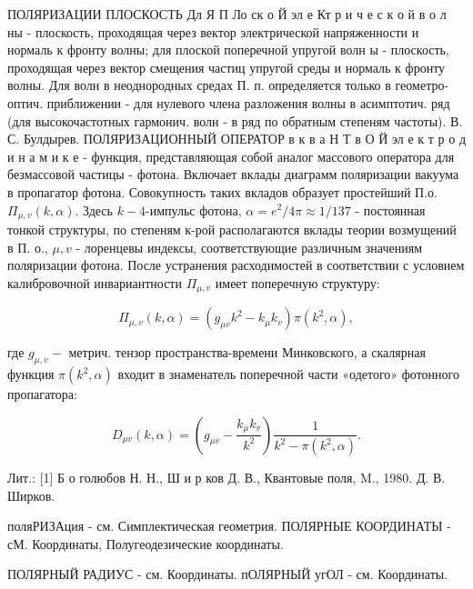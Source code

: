 \documentclass[10pt]{article}
\begin{document}
ПОЛЯРИЗАЦИИ ПЛОСКОСТЬ Дл Я П Ло ск о Й эл е Кт р и ч е с к о й в о л ны - плоскость, проходящая через вектор электрической напряженности и нормаль к фронту волны; для плоской поперечной упругой волн ы - плоскость, проходящая через вектор смещения частиц упругой среды и нормаль к фронту волны. Для волн в неоднородных средах П. п. определяется только в геометро-оптич. приближении - для нулевого члена разложения волны в асимптотич. ряд (для высокочастотных гармонич. волн - в ряд по обратным степеням частоты). В. С. Булдырев. ПОЛЯРИЗАЦИОННЫЙ ОПЕРАТОР в к в а Н Т в О Й эл е к т р о д и н а м и к е - функция, представляющая собой аналог массового оператора для безмассовой частицы - фотона. Включает вклады диаграмм поляризации вакуума в пропагатор фотона. Совокупность таких вкладов образует простейший П.о. $\Pi_{\mu, v}(k, \alpha)$. Здесь $k-4$-импульс фотона, $\alpha=e^{2} / 4 \pi \approx 1 / 137$ - постоянная тонкой структуры, по степеням к-рой располагаются вклады теории возмущений в П. о., $\mu, v$ - лоренцевы индексы, соответствующие различным значениям поляризации фотона. После устранения расходимостей в соответствии с условием калибровочной инвариантности $\Pi_{\mu, v}$ имеет поперечную структуру:



\[

\Pi_{\mu, v}(k, \alpha)=\left(g_{\mu v} k^{2}-k_{\mu} k_{v}\right) \pi\left(k^{2}, \alpha\right),

\]



где $g_{\mu, v}-$ метрич. тензор пространства-времени Минковского, а скалярная функция $\pi\left(k^{2}, \alpha\right)$ входит в знаменатель поперечной части «одетого» фотонного пропагатора:



\[

D_{\mu v}(k, \alpha)=\left(g_{\mu v}-\frac{k_{\mu} k_{v}}{k^{2}}\right) \frac{1}{k^{2}-\pi\left(k^{2}, \alpha\right)} .

\]



Лит.: [1] Б о голюбов Н. Н., Ш и р ков Д. В., Квантовые поля, M., 1980. Д. В. Ширков.



поляРИЗАция - см. Симплектическая геометрия. ПОЛЯРНЫЕ КООРДИНАТЫ - сМ. Координаты, Полугеодезические координаты.



ПОЛЯРНЫЙ РАДИУС - см. Координаты. пОЛЯРНЫЙ угОЛ - см. Координаты.
\end{document}
